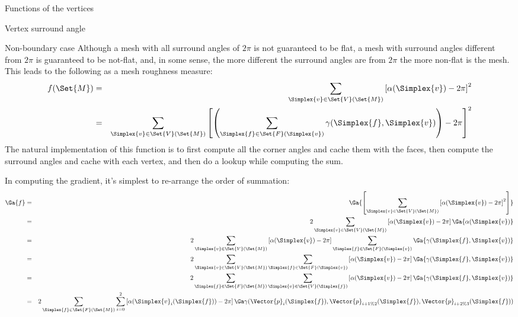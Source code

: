 \begin{plSection}{Functions of the vertices}
\begin{plSection}{Vertex surround angle}
\begin{plSection}{Non-boundary case}
Although a mesh with all surround angles of $2\pi$ is not guaranteed
to be flat,
a mesh with surround angles different from $2\pi$ is guaranteed
to be not-flat,
and, in some sense,
the more different the surround angles are from $2\pi$
the more non-flat is the mesh.
This leads to the following as a mesh roughness measure:
\begin{eqnarray}
f(\Set{M})
& = & \sum_{\Simplex{v} \in \Set{V}(\Set{M})} \left[ \alpha(\Simplex{v}) - 2\pi \right]^2
\\
& = & \sum_{\Simplex{v} \in \Set{V}(\Set{M})}
\left[ \left(\sum_{\Simplex{f} \in \Set{F}(\Simplex{v})} \gamma(\Simplex{f},\Simplex{v})\right)
 - 2\pi \right]^2
\nonumber
\end{eqnarray}
The natural implementation of this function is to first compute
all the corner angles and cache them with the faces,
then compute the surround angles and cache with each vertex,
and then do a lookup while computing the sum.

In computing the gradient, it's simplest to re-arrange the
order of summation:
\begin{eqnarray}
\Ga{f}
& = & \Ga{ \left[ \sum_{\Simplex{v} \in \Set{V}(\Set{M})} \left[ \alpha(\Simplex{v}) - 2\pi \right]^2 \right]}
\\
& = & 2 \sum_{\Simplex{v} \in \Set{V}(\Set{M})} \left[ \alpha(\Simplex{v}) - 2\pi \right] \Ga{\alpha(\Simplex{v})}
\nonumber
\\
& = & 2 \sum_{\Simplex{v} \in \Set{V}(\Set{M})} \left[ \alpha(\Simplex{v}) - 2\pi \right]
\sum_{\Simplex{f} \in \Set{F}(\Simplex{v})} \Ga{\gamma(\Simplex{f},\Simplex{v})}
\nonumber
\\
& = & 2 \sum_{\Simplex{v} \in \Set{V}(\Set{M})}
\sum_{\Simplex{f} \in \Set{F}(\Simplex{v})}
\left[ \alpha(\Simplex{v}) - 2\pi \right]
\Ga{\gamma(\Simplex{f},\Simplex{v})}
\nonumber
\\
& = & 2
\sum_{\Simplex{f} \in \Set{F}(\Set{M})}
\sum_{\Simplex{v} \in \Set{V}(\Simplex{f})}
\left[ \alpha(\Simplex{v}) - 2\pi \right]
\Ga{\gamma(\Simplex{f},\Simplex{v})}
\nonumber
\\
& = & 2
\sum_{\Simplex{f} \in \Set{F}(\Set{M})}
\sum_{i=0}^2
\left[ \alpha(\Simplex{v}_i(\Simplex{f})) - 2\pi \right]
\Ga{\gamma(\Vector{p}_i(\Simplex{f}),\Vector{p}_{i+1 \% 2}(\Simplex{f}),\Vector{p}_{i+2 \% 3}(\Simplex{f}))}
\nonumber
\end{eqnarray}


\end{plSection}
\end{plSection}
\end{plSection}
